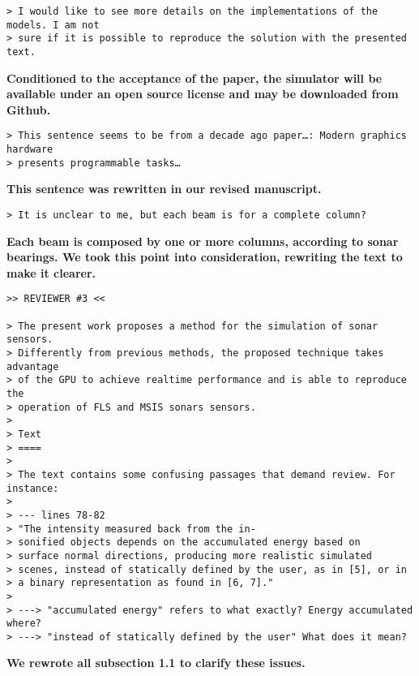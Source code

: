 \documentclass{article}
\begin{document}
\begin{verbatim}
> I would like to see more details on the implementations of the models. I am not
> sure if it is possible to reproduce the solution with the presented text.
\end{verbatim}

\textbf{Conditioned to the acceptance of the paper, the simulator will be available 
under an open source license and may be downloaded from Github.}

\begin{verbatim}
> This sentence seems to be from a decade ago paper…: Modern graphics hardware
> presents programmable tasks…
\end{verbatim}

\textbf{This sentence was rewritten in our revised manuscript.}

\begin{verbatim}
> It is unclear to me, but each beam is for a complete column?
\end{verbatim}

\textbf{Each beam is composed by one or more columns, according to sonar
bearings. We took this point into consideration, rewriting the text to make 
it clearer.}

\begin{verbatim}
>> REVIEWER #3 <<

> The present work proposes a method for the simulation of sonar sensors.
> Differently from previous methods, the proposed technique takes advantage
> of the GPU to achieve realtime performance and is able to reproduce the
> operation of FLS and MSIS sonars sensors.
>
> Text
> ====
>
> The text contains some confusing passages that demand review. For instance:
>
> --- lines 78-82
> "The intensity measured back from the in-
> sonified objects depends on the accumulated energy based on
> surface normal directions, producing more realistic simulated
> scenes, instead of statically defined by the user, as in [5], or in
> a binary representation as found in [6, 7]."
>
> ---> "accumulated energy" refers to what exactly? Energy accumulated where?
> ---> "instead of statically defined by the user" What does it mean?
\end{verbatim}

\textbf{We rewrote all subsection 1.1 to clarify these issues.}
\end{document}
